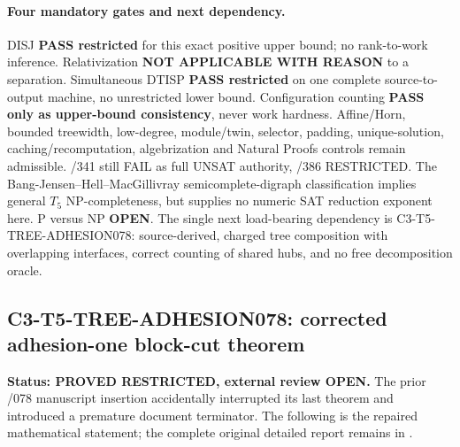 \documentclass[11pt]{article}
\begin{document}
\paragraph{Four mandatory gates and next dependency.}
DISJ \textbf{PASS restricted} for this exact positive upper bound;
no rank-to-work inference. Relativization \textbf{NOT APPLICABLE
WITH REASON} to a separation. Simultaneous DTISP \textbf{PASS
restricted} on one complete source-to-output machine, no
unrestricted lower bound. Configuration counting \textbf{PASS only
as upper-bound consistency}, never work hardness.
Affine/Horn, bounded treewidth, low-degree, module/twin,
selector, padding, unique-solution, caching/recomputation,
algebrization and Natural Proofs controls remain admissible.
/341 still FAIL as full UNSAT authority, /386 RESTRICTED.
The Bang-Jensen--Hell--MacGillivray semicomplete-digraph
classification implies general $T_5$ NP-completeness, but supplies
no numeric SAT reduction exponent here. P versus NP \textbf{OPEN}.
The single next load-bearing dependency is
\textsc{C3-T5-TREE-ADHESION078}: source-derived, charged tree
composition with overlapping interfaces, correct counting
of shared hubs, and no free decomposition oracle.



\subsection*{C3-T5-TREE-ADHESION078: corrected adhesion-one block-cut theorem}

\noindent\textbf{Status: PROVED RESTRICTED, external review OPEN.}
The prior /078 manuscript insertion accidentally interrupted its
last theorem and introduced a premature document terminator.
The following is the repaired mathematical statement; the complete
original detailed report remains in
.
\end{document}
